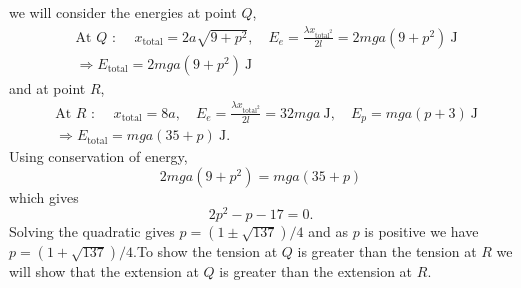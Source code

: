 \documentclass{article}
\begin{document}
\begin{figure}[h!]
\centering
{}
\end{figure}

we will consider the energies at point $Q$,
\begin{align*}
& \text{At $Q$ : }\quad  x_{\mathrm{total}} = 2a\sqrt{9+p^2},\quad  E_e = \frac{\lambda x_{\mathrm{total}^2}}{2l} = 2mga(9+p^2) \ \mathrm{J}\\ 
& \Rightarrow E_{\mathrm{total}} = 2mga(9+p^2) \ \mathrm{J}
\end{align*}
and at point $R$,
\begin{align*}
& \text{At $R$ : }\quad  x_{\mathrm{total}} = 8a, \quad  E_e = \frac{\lambda x_{\mathrm{total}^2}}{2l} = 32mga \ \mathrm{J}, \quad E_p = mga(p+3) \ \mathrm{J} \\ 
& \Rightarrow E_{\mathrm{total}} = mga(35+p) \ \mathrm{J}.
\end{align*}
Using conservation of energy,
\[
2mga(9+p^2)= mga(35+p)
\]
which gives 
\[
2p^2-p-17=0.
\]
Solving the quadratic gives $p=(1 \pm \sqrt{137})/4$ and as $p$ is positive we have $p=(1 +\sqrt{137})/4$.To show the tension at $Q$ is greater than the tension at $R$ we will show that the extension at $Q$ is greater than the extension at $R$.\par 
\end{document}
